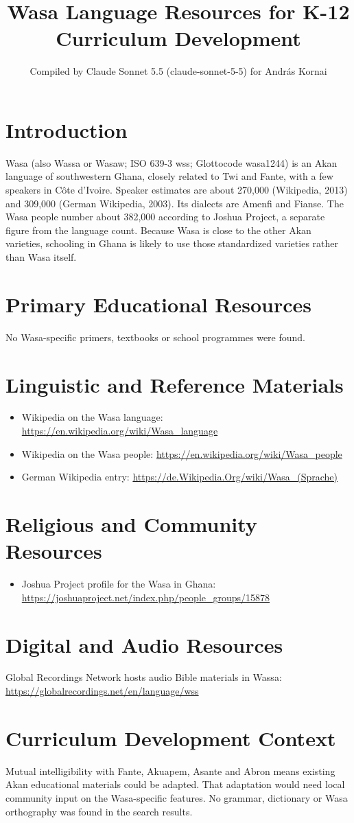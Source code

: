 \documentclass[12pt]{article}
\title{Wasa Language Resources for K-12 Curriculum Development}
\author{Compiled by Claude Sonnet 5.5 (claude-sonnet-5-5) for Andr\'as Kornai}
\date{}
\begin{document}
\maketitle

\section{Introduction}
Wasa (also Wassa or Wasaw; ISO 639-3 wss; Glottocode wasa1244) is an Akan language of southwestern Ghana, closely related to Twi and Fante, with a few speakers in C\^ote d'Ivoire. Speaker estimates are about 270,000 (Wikipedia, 2013) and 309,000 (German Wikipedia, 2003). Its dialects are Amenfi and Fianse. The Wasa people number about 382,000 according to Joshua Project, a separate figure from the language count. Because Wasa is close to the other Akan varieties, schooling in Ghana is likely to use those standardized varieties rather than Wasa itself.

\section{Primary Educational Resources}
No Wasa-specific primers, textbooks or school programmes were found.

\section{Linguistic and Reference Materials}
\begin{itemize}
\item Wikipedia on the Wasa language: \url{https://en.wikipedia.org/wiki/Wasa_language}
\item Wikipedia on the Wasa people: \url{https://en.wikipedia.org/wiki/Wasa_people}
\item German Wikipedia entry: \url{https://de.Wikipedia.Org/wiki/Wasa_(Sprache)}
\end{itemize}

\section{Religious and Community Resources}
\begin{itemize}
\item Joshua Project profile for the Wasa in Ghana: \url{https://joshuaproject.net/index.php/people_groups/15878}
\end{itemize}

\section{Digital and Audio Resources}
Global Recordings Network hosts audio Bible materials in Wassa: \url{https://globalrecordings.net/en/language/wss}

\section{Curriculum Development Context}
Mutual intelligibility with Fante, Akuapem, Asante and Abron means existing Akan educational materials could be adapted. That adaptation would need local community input on the Wasa-specific features. No grammar, dictionary or Wasa orthography was found in the search results.
\end{document}
